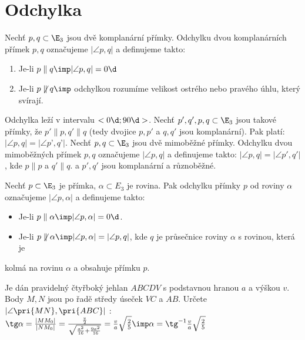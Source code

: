 
\let\braceru=\relax \let\bracelu=\relax 
\def\o#1{\setbox0=
	\hbox{$\kern2pt\overbrace{\kern-2pt#1\kern-2pt}\kern2pt$}\ht0=2.1ex\box0}
\def\to#1{\hbox{#1\rlap{\t{}}}}
\def\rad{\rm{rad}}
\def\f{\frac}
\section{Odchylka}
\Def Nechť $p,q\subset \E_3$ jsou  dvě komplanární přímky. Odchylku dvou komplanárních přímek
$p,q$ označujeme $|\angle p ,q|$ a definujeme takto:
\begin{enumerate}
	\item Je-li $p\parallel q \imp |\angle p,q| = 0\d$
	\item Je-li $p\not\parallel q \imp $ odchylkou rozumíme velikost ostrého nebo pravého úhlu, který svírají.
\end{enumerate}

\Poz Odchylka leží v intervalu $<0\d;90\d>$.
\V  Nechť $p',q', p, q \subset\E_3$ jsou takové přímky, že $p'\parallel p, q'\parallel q$ (tedy dvojice $p, p'$ a $q, q'$ jsou
komplanární). Pak platí: $|\angle p ,q| =  |\angle p’, q’|$.
\Def Nechť $p, q \subset \E_3$ jsou dvě mimoběžné přímky. Odchylku dvou mimoběžných přímek $p,q$
označujeme $|\angle p ,q|$ a definujeme takto: $|\angle p ,q| = |\angle p', q'|$, kde $p\parallel p$ a $q' \parallel q$. a $p',q'$
jsou komplanární a různoběžné.

\Def Nechť $p \subset\E_3$ je přímka, $\alpha \subset E_3$ je rovina. Pak odchylku přímky $p$ od roviny $\alpha$
označujeme $|\angle p , \alpha|$ a definujeme takto:
\begin{itemize}
	\item Je-li $p \parallel \alpha \imp |\angle p,\alpha| = 0\d$.
	\item Je-li $p\not\parallel \alpha \imp|\angle p,\alpha|=|\angle p,q|$, kde $q$ je průsečnice roviny $\alpha$ s rovinou, která je
\end{itemize}
kolmá na rovinu $\alpha$ a obsahuje přímku $p$.

\Pr Je dán pravidelný čtyřboký jehlan $ABCDV$
s podstavnou hranou $a$ a výškou $v$.
Body $M,N$ jsou po řadě středy úseček $VC$ a
$AB$. Určete $|\angle \pri{MN},\pri{ABC}|$ : 
$\tg \alpha = \f{|MM_0|}{|NM_0|}=\f{\f v 2}{\sqrt{\f{a^2}{16}+\f{9a^2}{16}}}=\f{v}{a}\*\sqrt{\f 2 5} \imp \alpha = \tg^{-1} \f{v}{a}\*\sqrt{\f 2 5}$


\EndDoc


